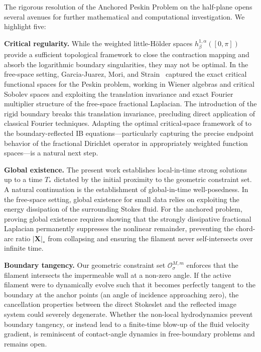 \documentclass{amsart}
\begin{document}
The rigorous resolution of the Anchored Peskin Problem on the half-plane opens several avenues for further mathematical and computational investigation. We highlight five:

{\bf Critical regularity.}
While the weighted little-H\"{o}lder spaces $h^{1,\alpha}_\beta([0,\pi])$ provide a sufficient topological framework to close the contraction mapping and absorb the logarithmic boundary singularities, they may not be optimal. In the free-space setting, Garcia-Juarez, Mori, and Strain~\cite{garcia2020peskin} captured the exact critical functional spaces for the Peskin problem, working in Wiener algebras and critical Sobolev spaces and exploiting the translation invariance and exact Fourier multiplier structure of the free-space fractional Laplacian. The introduction of the rigid boundary breaks this translation invariance, precluding direct application of classical Fourier techniques. Adapting the optimal critical-space framework of \cite{garcia2020peskin} to the boundary-reflected IB equations---particularly capturing the precise endpoint behavior of the fractional Dirichlet operator in appropriately weighted function spaces---is a natural next step.

{\bf Global existence.}
The present work establishes local-in-time strong solutions up to a time $T_*$ dictated by the initial proximity to the geometric constraint set. A natural continuation is the establishment of global-in-time well-posedness. In the free-space setting, global existence for small data relies on exploiting the energy dissipation of the surrounding Stokes fluid. For the anchored problem, proving global existence requires showing that the strongly dissipative fractional Laplacian permanently suppresses the nonlinear remainder, preventing the chord-arc ratio $|\mathbf{X}|_*$ from collapsing and ensuring the filament never self-intersects over infinite time.

{\bf Boundary tangency.}
Our geometric constraint set $\mathcal{O}^{M,m}_\sigma$ enforces that the filament intersects the impermeable wall at a non-zero angle. If the active filament were to dynamically evolve such that it becomes perfectly tangent to the boundary at the anchor points (an angle of incidence approaching zero), the cancellation properties between the direct Stokeslet and the reflected image system could severely degenerate. Whether the non-local hydrodynamics prevent boundary tangency, or instead lead to a finite-time blow-up of the fluid velocity gradient, is reminiscent of contact-angle dynamics in free-boundary problems and remains open.
\end{document}
